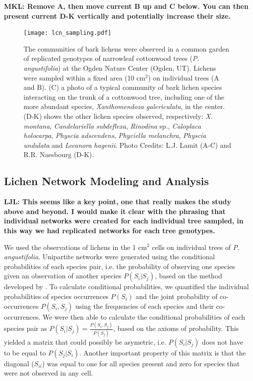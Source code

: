 \documentclass[11pt,twocolumn,twoside,lineno]{pnas-new}
\begin{document}
{\textbf{MKL: Remove A, then move current B up and C below. You can
  then present current D-K vertically and potentially increase their
  size.}


\begin{figure}[ht]
\centering
\texttt{[image: lcn\_sampling.pdf]}
\caption{The communities of bark lichens were observed in a common
  garden of replicated genotypes of narrowleaf cottonwood trees
  (\textit{P. angustifolia}) at the Ogden Nature Center (Ogden,
  UT). Lichens were sampled within a fixed area (10 cm$^2$) on
  individual trees (A and B). (C) a photo of a typical community of
  bark lichen species interacting on the trunk of a cottonwood tree,
  including one of the more abundant species, \textit{Xanthomendoza
    galericulata}, in the center. (D-K) shows the other lichen species
  observed, respectively:  \textit{X. montana}, \textit{Candelariella
    subdeflexa}, \textit{Rinodina} sp., \textit{Caloplaca holocarpa},
  \textit{Physcia adscendens}, \textit{Phyciella melanchra},
  \textit{Physcia undulata} and \textit{Lecanora hagenii}. Photo
  Credits: L.J. Lamit (A-C) and R.R. Naesbourg (D-K).}
\label{fig:lichen_sampling}
\end{figure}


\subsection*{Lichen Network Modeling and Analysis}

\textbf{LJL: This seems like a key point, one that really makes the
  study above and beyond.  I would make it clear with the phrasing
  that individual networks were created for each individual tree
  sampled, in this way we had replicated networks for each tree
  genotypes.}

We used the observations of lichens in the 1 cm$^2$ cells on individual
trees of \textit{P. angustifolia}. Unipartite networks were generated
using the conditional probabilities of each species pair, i.e. the
probability of observing one species given an observation of another
species $P(S_i | S_j)$, based on the method developed by
\citep{Araujo2011}. To calculate conditional probabilities, we
quantified the individual probabilities of species occurrences
$P(S_i)$ and the joint probability of co-occurrences $P(S_i,S_j)$
using the frequencies of each species and their co-occurrences. We
were then able to calculate the conditional probabilities of each
species pair as $P(S_i|S_j) = \frac{P(S_i,S_j)}{P(S_j)}$, based on the
axioms of probability. This yielded a matrix that could possibly be
asymetric, i.e. $P(S_i|S_j)$ does not have to be equal to
$P(S_j|S_i)$. Another important property of this matrix is that the
diagonal ($S_{ii}$) was equal to one for all species present and zero
for species that were not observed in any cell.

}
\end{document}

